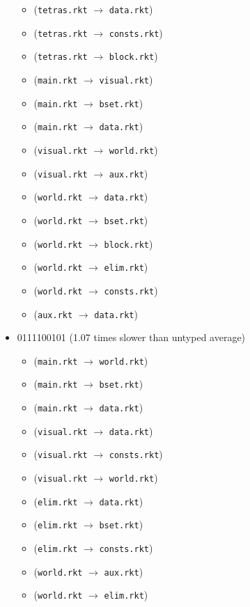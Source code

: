 \documentclass{article}
\newcommand{\mono}[1]{\texttt{#1}}
\begin{document}
\begin{itemize}
\begin{itemize}
  \item (\mono{tetras.rkt} $\rightarrow$ \mono{data.rkt})
  \item (\mono{tetras.rkt} $\rightarrow$ \mono{consts.rkt})
  \item (\mono{tetras.rkt} $\rightarrow$ \mono{block.rkt})
  \item (\mono{main.rkt} $\rightarrow$ \mono{visual.rkt})
  \item (\mono{main.rkt} $\rightarrow$ \mono{bset.rkt})
  \item (\mono{main.rkt} $\rightarrow$ \mono{data.rkt})
  \item (\mono{visual.rkt} $\rightarrow$ \mono{world.rkt})
  \item (\mono{visual.rkt} $\rightarrow$ \mono{aux.rkt})
  \item (\mono{world.rkt} $\rightarrow$ \mono{data.rkt})
  \item (\mono{world.rkt} $\rightarrow$ \mono{bset.rkt})
  \item (\mono{world.rkt} $\rightarrow$ \mono{block.rkt})
  \item (\mono{world.rkt} $\rightarrow$ \mono{elim.rkt})
  \item (\mono{world.rkt} $\rightarrow$ \mono{consts.rkt})
  \item (\mono{aux.rkt} $\rightarrow$ \mono{data.rkt})
  \end{itemize}
\item 0111100101 (1.07 times slower than untyped average)
  \begin{itemize}
  \item (\mono{main.rkt} $\rightarrow$ \mono{world.rkt})
  \item (\mono{main.rkt} $\rightarrow$ \mono{bset.rkt})
  \item (\mono{main.rkt} $\rightarrow$ \mono{data.rkt})
  \item (\mono{visual.rkt} $\rightarrow$ \mono{data.rkt})
  \item (\mono{visual.rkt} $\rightarrow$ \mono{consts.rkt})
  \item (\mono{visual.rkt} $\rightarrow$ \mono{world.rkt})
  \item (\mono{elim.rkt} $\rightarrow$ \mono{data.rkt})
  \item (\mono{elim.rkt} $\rightarrow$ \mono{bset.rkt})
  \item (\mono{elim.rkt} $\rightarrow$ \mono{consts.rkt})
  \item (\mono{world.rkt} $\rightarrow$ \mono{aux.rkt})
  \item (\mono{world.rkt} $\rightarrow$ \mono{elim.rkt})

\end{itemize}
\end{itemize}
\end{document}
